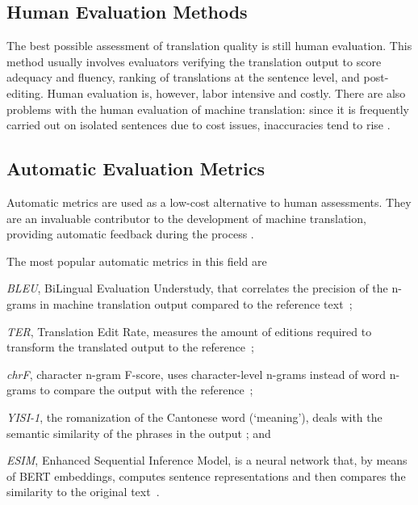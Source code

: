 \documentclass[runningheads]{llncs}
\begin{document}
\subsection{Human Evaluation Methods}

The best possible assessment of translation quality is still human evaluation. This method usually involves evaluators verifying the translation output to score adequacy and fluency, ranking of translations at the sentence level, and post-editing. Human evaluation is, however, labor intensive and costly. There are also problems with the human evaluation of machine translation: since it is frequently carried out on isolated sentences due to cost issues, inaccuracies tend to rise \cite{freitag2021experts}.

\subsection{Automatic Evaluation Metrics}

Automatic metrics are used as a low-cost alternative to human assessments. They are an invaluable contributor to the development of machine translation, providing automatic feedback during the process \cite{mathur2020tangled}.

The most popular automatic metrics in this field are
\begin{enumerate*}
    \item \textit{BLEU}, BiLingual Evaluation Understudy, that correlates the precision of the n-grams in machine translation output compared to the reference text~\cite{papineni2002bleu}; 
    \item \textit{TER}, Translation Edit Rate, measures the amount of editions required to transform the translated output to the reference~\cite{snover2006study}; 
    \item \textit{chrF}, character n-gram F-score, uses character-level n-grams instead of word n-grams to compare the output with the reference~\cite{popovic2015chrf}; 
    \item \textit{YISI-1}, the romanization of the Cantonese word (‘meaning’), deals with the semantic similarity of the phrases in the output \cite{lo2019yisi}; and 
    \item \textit{ESIM}, Enhanced Sequential Inference Model, is a neural network that, by means of BERT embeddings, computes sentence representations and then compares the similarity to the original text~\cite{chen2016enhanced}.
    
\end{enumerate*}
\end{document}
